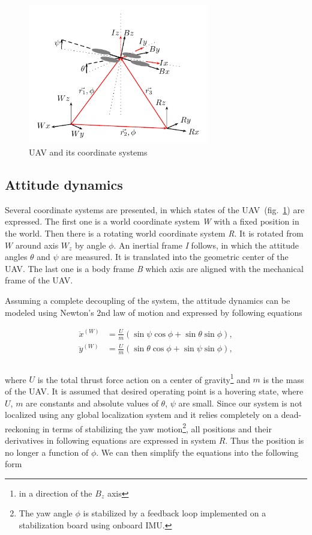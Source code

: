 \begin{figure}[!h]
\centering
\includegraphics[width=0.7\textwidth]{fig/coordinate_system.pdf}
\caption{UAV and its coordinate systems}
\label{fig:coordinate_system}
\end{figure}

\subsection{Attitude dynamics}

Several coordinate systems are presented, in which states of the UAV~(fig.~\ref{fig:coordinate_system}) are expressed. The first one is a world coordinate system \textit{W} with a fixed position in the world. Then there is a rotating world coordinate system \textit{R}. It is rotated from $W$ around axis $W_z$ by angle $\phi$. An inertial frame \textit{I} follows, in which the attitude angles $\theta$ and $\psi$ are measured. It is translated into the geometric center of the UAV. The last one is a body frame \textit{B} which axis are aligned with the mechanical frame of the UAV.

Assuming a complete decoupling of the system, the attitude dynamics can be modeled using Newton's 2nd law of motion and expressed by following equations

\begin{equation}
\begin{split}
\ddot{x}^{(W)} &= \frac{U}{m}\left(\sin\psi\cos\phi + \sin\theta\sin\phi\right),\\
\ddot{y}^{(W)} &= \frac{U}{m}\left(\sin\theta\cos\phi + \sin\psi\sin\phi\right),\\
\end{split}
\end{equation}
\\
where $U$ is the total thrust force action on a center of gravity\footnote{in a direction of the $B_z$ axis} and $m$ is the mass of the UAV. It is assumed that desired operating point is a hovering state, where $U$, $m$ are constants and absolute values of $\theta$, $\psi$ are small. Since our system is not localized using any global localization system and it relies completely on a dead-reckoning in terms of stabilizing the yaw motion\footnote{The yaw angle $\phi$ is stabilized by a feedback loop implemented on a stabilization board using onboard IMU.}, all positions and their derivatives in following equations are expressed in system $R$. Thus the position is no longer a function of $\phi$. We can then simplify the equations into the following form

